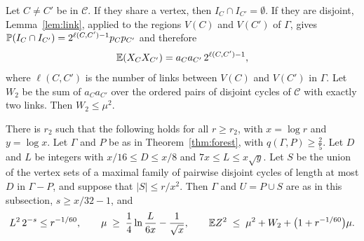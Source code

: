 Let $C\ne C'$ be in $\mathcal{C}$. If they share a vertex, then $I_C\cap I_{C'}=\emptyset$. If they
are disjoint, Lemma~\ref{lem:link}, applied to the regions $V(C)$ and $V(C')$ of $\Gamma$, gives
$\mathbb{P}(I_C\cap I_{C'})=2^{\ell(C,C')-1}p_Cp_{C'}$ and therefore
\begin{equation}\label{eq:pair}
  \mathbb{E}(X_CX_{C'})=a_Ca_{C'}\,2^{\ell(C,C')-1},
\end{equation}
where $\ell(C,C')$ is the number of links between $V(C)$ and $V(C')$ in $\Gamma$. Let $W_2$ be
the sum of $a_Ca_{C'}$ over the ordered pairs of disjoint cycles of $\mathcal{C}$ with exactly two
links. Then $W_2\le\mu^{2}$.

\begin{proposition}\label{prop:loggirth}
There is $r_2$ such that the following holds for all $r\ge r_2$, with $x=\log r$ and $y=\log x$.
Let $\Gamma$ and $P$ be as in Theorem~\ref{thm:forest}, with $q(\Gamma,P)\ge\frac25$. Let $D$ and
$L$ be integers with $x/16\le D\le x/8$ and $7x\le L\le x\sqrt y$. Let $S$ be the union of the
vertex sets of a maximal family of pairwise disjoint cycles of length at most $D$ in $\Gamma-P$,
and suppose that $|S|\le r/x^{2}$. Then $\Gamma$ and $U=P\cup S$ are as in this subsection,
$s\ge x/32-1$, and
\[
  L^{2}\,2^{-s}\le r^{-1/60},\qquad
  \mu\;\ge\;\frac14\ln\frac{L}{6x}-\frac1{\sqrt x},\qquad
  \mathbb{E} Z^{2}\;\le\;\mu^{2}+W_2+\bigl(1+r^{-1/60}\bigr)\mu .
\]
\end{proposition}

